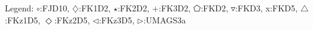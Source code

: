 Legend: {\color{CornflowerBlue}$\circ$}:FJD10, {\color{Orange}$\diamondsuit$}:FK1D2, {\color{Green}$\star$}:FK2D2, {\color{red}+}:FK3D2, {\color{magenta}$\pentagon$}:FKD2, {\color{brown}$\triangledown$}:FKD3, {{}x}:FKD5, {{}$\triangle$}:FKz1D5, {{}$\Diamond$}:FKz2D5, {{}$\triangleleft$}:FKz3D5, {{}$\triangleright$}:UMAGS3a